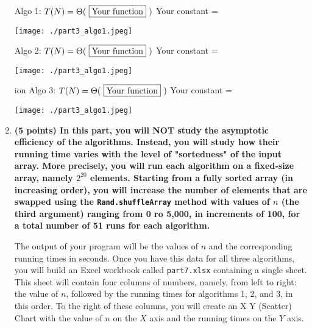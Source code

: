\documentclass[12pt]{article}
\begin{document}
\begin{enumerate}
{   \newpage


   Algo 1: $T(N) =\Theta(\ \fbox{\color{black}{Your function}}\ )$
   \hfill Your constant =  \fbox{\color{black}{Your value}}

   \centerline{\texttt{[image: ./part3\_algo1.jpeg]}}


    Algo 2: $T(N) =\Theta(\ \fbox{\color{black}{Your function}}\ )$
    \hfill Your constant =  \fbox{\color{black}{Your value}}

   \centerline{\texttt{[image: ./part3\_algo1.jpeg]}}

ion
    Algo 3: $T(N) =\Theta(\ \fbox{\color{black}{Your function}}\ )$
    \hfill Your constant =  \fbox{\color{black}{Your value}}

   \centerline{\texttt{[image: ./part3\_algo1.jpeg]}}

   \newpage
 }


   \item                            %
   {\bf \color{red} (5 points) In this part, you will NOT study the asymptotic
   efficiency of the algorithms. Instead, you will study how their
   running time varies with the level of "sortedness" of the input array.
   More precisely, you will run each algorithm on a fixed-size array, namely
   $2^{20}$ elements. Starting from a fully sorted array (in increasing order),
   you will increase the number of elements that are swapped using the
   {\tt Rand.shuffleArray} method with values of $n$ (the third argument)
   ranging from 0 ro 5,000, in increments of 100, for a total number of 51
   runs for each algorithm.

   The output of your program will be the values of $n$ and the corresponding
   running times in seconds. Once you have this data for all three algorithms,
   you will build an Excel workbook called {\tt part7.xlsx} containing a single
   sheet. This sheet will contain four columns of numbers, namely, from left
   to right: the value of $n$, followed by the running times for algorithms 1,
   2, and 3, in this order. To the right of these columns, you will create an
   X Y (Scatter) Chart with the value of $n$ on the $X$ axis and the running
   times on the $Y$ axis.

}
\end{enumerate}
\end{document}
